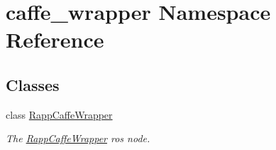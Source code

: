\hypertarget{namespacecaffe__wrapper}{\section{caffe\-\_\-wrapper Namespace Reference}
\label{namespacecaffe__wrapper}
}
\subsection*{Classes}
\begin{DoxyCompactItemize}
\item 
class \hyperlink{classcaffe__wrapper_1_1RappCaffeWrapper}{Rapp\-Caffe\-Wrapper}
\begin{DoxyCompactList}\small\item\em The \hyperlink{classcaffe__wrapper_1_1RappCaffeWrapper}{Rapp\-Caffe\-Wrapper} ros node. \end{DoxyCompactList}\end{DoxyCompactItemize}
